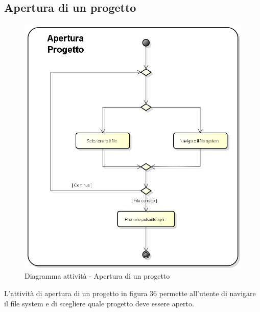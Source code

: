 \subsection{Apertura di un progetto}
\begin{figure}[h] 
	\centering 
	\includegraphics[scale=0.3] {img/activity_apertura.png}
	\caption{Diagramma attività - Apertura di un progetto} 
\end{figure}
L'attività di apertura di un progetto in figura 36 permette all'utente di navigare il file system e di scegliere quale progetto deve essere aperto.
\newpage


